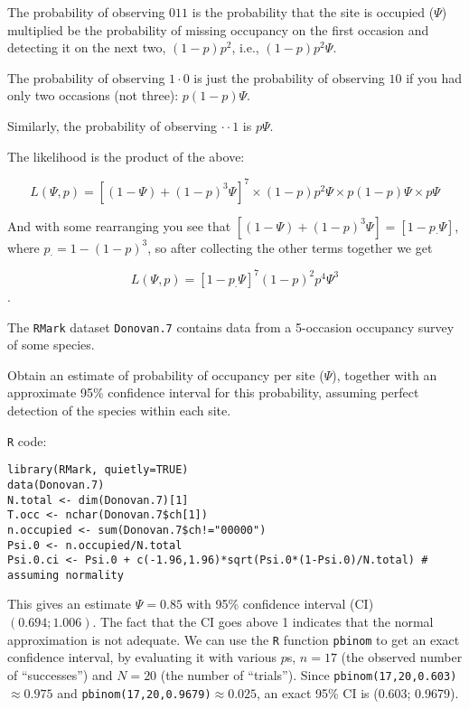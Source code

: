 \begin{questions}
{\begin{solution}
The probability of observing $011$ is the probability that the site is occupied ($\Psi$) multiplied be the probability of missing occupancy on the first occasion and detecting it on the next two, $(1-p)p^2$, i.e., $(1-p)p^2\Psi$.

The probability of observing $1\cdot 0$ is just the probability of observing $10$ if you had only two occasions (not three): $p(1-p)\Psi$.

Similarly, the probability of observing $\cdot\cdot1$ is $p\Psi$.

The likelihood is the product of the above:

$$L(\Psi,p)=\left[(1-\Psi)+(1-p)^3\Psi\right]^7\times (1-p)p^2\Psi\times p(1-p)\Psi\times p\Psi$$

And with some rearranging you see that $\left[(1-\Psi)+(1-p)^3\Psi\right]=\left[1-p_\cdot\Psi\right]$, where $p_\cdot=1-(1-p)^3$, so after collecting the other terms together we get

$$L(\Psi,p)=\left[1-p_\cdot\Psi\right]^7(1-p)^2p^4\Psi^3$$.

\end{solution}}

\item The \verb|RMark| dataset \verb|Donovan.7| contains data from a 5-occasion occupancy survey of some species.

\begin{parts}

\item Obtain an estimate of probability of occupancy per site ($\Psi$), together with an approximate 95\% confidence interval for this probability, assuming perfect detection of the species within each site.

{\begin{solution}
\verb|R| code:
\begin{verbatim}
library(RMark, quietly=TRUE)
data(Donovan.7)
N.total <- dim(Donovan.7)[1]
T.occ <- nchar(Donovan.7$ch[1])
n.occupied <- sum(Donovan.7$ch!="00000")
Psi.0 <- n.occupied/N.total
Psi.0.ci <- Psi.0 + c(-1.96,1.96)*sqrt(Psi.0*(1-Psi.0)/N.total) # assuming normality
\end{verbatim}
This gives an estimate $\Psi=0.85$ with 95\% confidence interval (CI) $(0.694; 1.006)$. The fact that the CI goes above 1 indicates that the normal approximation is not adequate. We can use the \verb|R| function \verb|pbinom| to get an exact confidence interval, by evaluating it with various $p$s, $n=17$ (the observed number of ``successes'') and $N=20$ (the number of ``trials''). Since \verb|pbinom(17,20,0.603)|$\approx 0.975$ and \verb|pbinom(17,20,0.9679)|$\approx 0.025$, an exact 95\% CI is (0.603; 0.9679).


\end{solution}}
\end{parts}
\end{questions}
